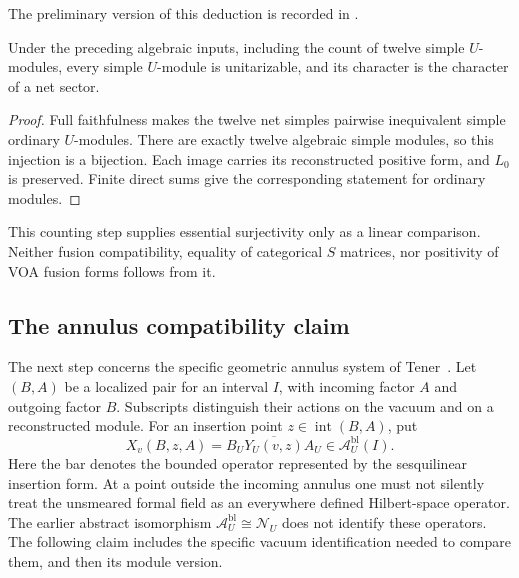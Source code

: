The preliminary version of this deduction is recorded in
.

\begin{proposition}
\label{prop:analytic-strong-unitarity}
Under the preceding algebraic inputs, including the count of twelve
simple $U$-modules, every simple $U$-module is
unitarizable, and its character is the character of a net sector.
\end{proposition}
\begin{proof}
Full faithfulness makes the twelve net simples pairwise inequivalent
simple ordinary $U$-modules.  There are exactly twelve algebraic simple
modules, so this injection is a bijection.  Each image carries its
reconstructed positive form, and $L_0$ is preserved.  Finite direct sums
give the corresponding statement for ordinary modules.
\end{proof}

This counting step supplies essential surjectivity only as a linear
comparison.  Neither fusion compatibility, equality of categorical
$S$ matrices, nor positivity of VOA fusion forms follows from it.

\subsection{The annulus compatibility claim}
\label{subsec:analytic-annuli}

The next step concerns the specific geometric annulus system of
Tener~\cite[Definition~3.18 and Corollaries~3.20--3.22]{TenFields}.
Let $(B,A)$ be a localized pair for an interval $I$, with incoming
factor $A$ and outgoing factor $B$.  Subscripts distinguish their
actions on the vacuum and on a reconstructed module.  For an insertion
point $z\in\operatorname{int}(B,A)$, put
\[
 X_v(B,z,A)=\overline{B_UY_U(v,z)A_U}
       \in\mathcal A_U^{\mathrm{bl}}(I).
\]
Here the bar denotes the bounded operator represented by the
sesquilinear insertion form.  At a point outside the incoming annulus
one must not silently treat the unsmeared formal field as an everywhere
defined Hilbert-space operator.  The earlier abstract isomorphism
$\mathcal A_U^{\mathrm{bl}}\cong\mathcal N_U$ does not identify these
operators.  The following claim includes the specific vacuum
identification needed to compare them, and then its module version.

